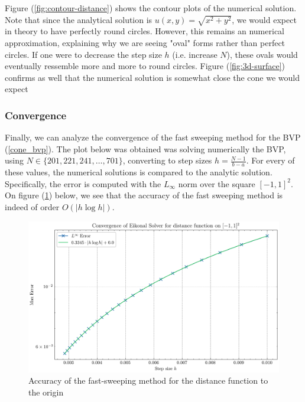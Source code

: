\documentclass[11pt]{article}
\theoremstyle{definition}
\theoremstyle{remark}
\begin{document}
\noindent Figure (\ref{fig:contour-distance}) shows the contour plots of the numerical solution. Note that since the analytical solution is $u(x,y)=\sqrt{x^2+y^2}$, we would expect in theory to have perfectly round circles. However, this remains an numerical approximation, explaining why we are seeing "oval" forms rather than perfect circles. If one were to decrease the step size $h$ (i.e. increase $N$), these ovals would eventually ressemble more and more to round circles.
Figure (\ref{fig:3d-surface}) confirms as well that the numerical solution is somewhat close the cone we would expect \\

\subsubsection{Convergence}
Finally, we can analyze the convergence of the fast sweeping method for the BVP (\ref{cone_bvp}). The plot below was obtained was solving numerically the BVP, using $N\in\{201, 221,241,\dots,701\}$, converting to step sizes $h=\frac{N-1}{b-a}$. For every of these values, the numerical solutions is compared to the analytic solution. Specifically, the error is computed with the $L_\infty$ norm over the square $[-1,1]^2$. \\
On figure (\ref{fig:error_distance}) below, we see that the accuracy of the fast sweeping method is indeed of order $O(|h\log h|)$.


\begin{figure}[h]
  \centering
  \includegraphics[width=0.7\linewidth]{plots/convergence2d_step_size.png}
  \caption{Accuracy of the fast-sweeping method for the distance function to the origin}
  \label{fig:error_distance}
\end{figure}
\end{document}
